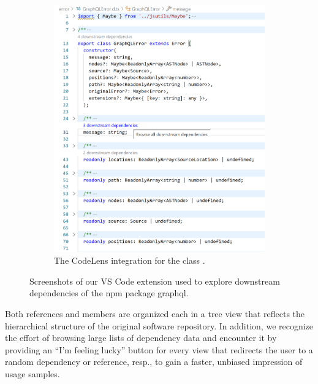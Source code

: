\begin{figure}
\begin{subfigure}{.32\linewidth}
		\includegraphics[width=\linewidth]{sections/4_implementation/extension/codelens.png}
		\caption[LoF entry]{The CodeLens integration for the class .}
		\label{fig:implementation/presentation/screenshot/codelens}
	\end{subfigure}

	\caption{Screenshots of our VS Code extension used to explore downstream dependencies of the npm package graphql.}
	\label{fig:implementation/presentation/screenshots}
\end{figure}

Both references and members are organized each in a tree view that reflects the hierarchical structure of the original software repository.
In addition, we recognize the effort of browsing large lists of dependency data and encounter it by providing an ``I'm feeling lucky'' button for every view that redirects the user to a random dependency or reference, resp., to gain a faster, unbiased impression of usage samples.

